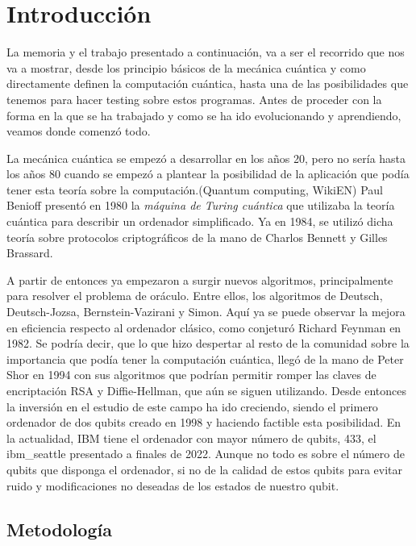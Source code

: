 \cleardoublepage

\chapter{Introducción}
\label{makereference}
La memoria y el trabajo presentado a continuación, va a ser el recorrido que nos va a mostrar, desde los principio básicos de la mecánica cuántica y como directamente definen la computación cuántica, hasta una de las posibilidades que tenemos para hacer testing sobre estos programas. Antes de proceder con la forma en la que se ha trabajado y como se ha ido evolucionando y aprendiendo, veamos donde comenzó todo. \newline

La mecánica cuántica se empezó a desarrollar en los años 20, pero no sería hasta los años 80 cuando se empezó a plantear la posibilidad de la aplicación que podía tener esta teoría sobre la computación.(Quantum computing, WikiEN) Paul Benioff presentó en 1980 la \textit{máquina de Turing cuántica} que utilizaba la teoría cuántica para describir un ordenador simplificado. Ya en 1984, se utilizó dicha teoría sobre protocolos criptográficos de la mano de Charlos Bennett y Gilles Brassard. \newline

A partir de entonces ya empezaron a surgir nuevos algoritmos, principalmente para resolver el problema de oráculo. Entre ellos, los algoritmos de Deutsch, Deutsch-Jozsa, Bernstein-Vazirani y Simon. Aquí ya se puede observar la mejora en eficiencia respecto al ordenador clásico, como conjeturó Richard Feynman en 1982. Se podría decir, que lo que hizo despertar al resto de la comunidad sobre la importancia que podía tener la computación cuántica, llegó de la mano de Peter Shor en 1994 con sus algoritmos que podrían permitir romper las claves de encriptación RSA y Diffie-Hellman, que aún se siguen utilizando. Desde entonces la inversión en el estudio de este campo ha ido creciendo, siendo el primero ordenador de dos qubits creado en 1998 y haciendo factible esta posibilidad. En la actualidad, IBM tiene el ordenador con mayor número de qubits, 433, el ibm\_seattle presentado a finales de 2022. Aunque no todo es sobre el número de qubits que disponga el ordenador, si no de la calidad de estos qubits para evitar ruido y modificaciones no deseadas de los estados de nuestro qubit.

\newpage
\section{Metodología}

